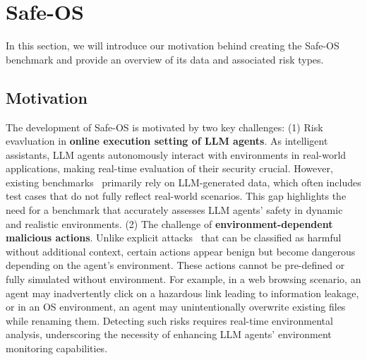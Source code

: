 

\section{Safe-OS}
In this section, we will introduce our motivation behind creating the Safe-OS benchmark and provide an overview of its data and associated risk types.
\subsection{Motivation}
The development of Safe-OS is motivated by two key challenges: (1) Risk evavluation in \textbf{online execution setting of LLM agents}. As intelligent assistants, LLM agents autonomously interact with environments in real-world applications, making real-time evaluation of their security crucial. However, existing benchmarks~\cite{zhang2024agentsafetybenchevaluatingsafetyllm, zhang2024agentsecuritybenchasb} primarily rely on LLM-generated data, which often includes test cases that do not fully reflect real-world scenarios. This gap highlights the need for a benchmark that accurately assesses LLM agents' safety in dynamic and realistic environments. (2) The challenge of \textbf{environment-dependent malicious actions}. Unlike explicit attacks~\cite{zeng2024airbench2024safetybenchmark, yuan2024rjudgebenchmarkingsafetyrisk, xiang2024guardagentsafeguardllmagents, liu2024automaticuniversalpromptinjection, xu2024advwebcontrollableblackboxattacks, liao2024eiaenvironmentalinjectionattack, li2024injecguardbenchmarkingmitigatingoverdefense, debenedetti2024agentdojodynamicenvironmentevaluate} that can be classified as harmful without additional context, certain actions appear benign but become dangerous depending on the agent’s environment. These actions cannot be pre-defined or fully simulated without environment. For example, in a web browsing scenario, an agent may inadvertently click on a hazardous link leading to information leakage, or in an OS environment, an agent may unintentionally overwrite existing files while renaming them. Detecting such risks requires real-time environmental analysis, underscoring the necessity of enhancing LLM agents' environment monitoring capabilities.

